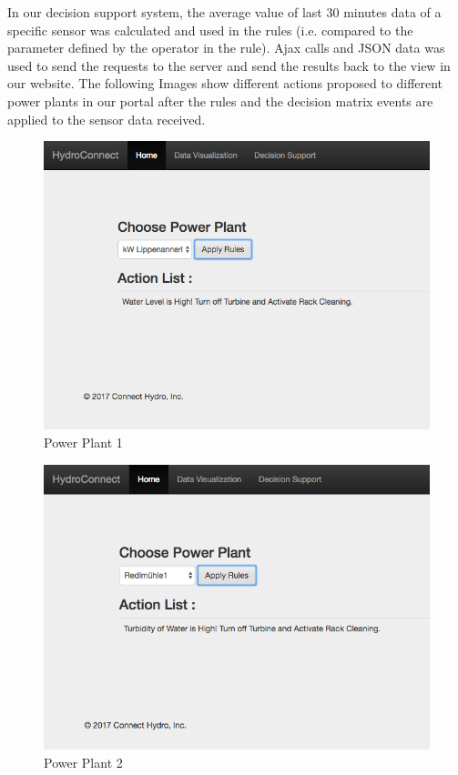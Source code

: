 In our decision support system, the average value of last 30 minutes data of a specific sensor was calculated and used in the rules (i.e. compared to the parameter defined by the operator in the rule). Ajax calls and JSON data was used to send the requests to the server and send the results back to the view in our website. The following Images show different actions proposed to different power plants in our portal after the rules and the decision matrix events are applied to the sensor data received.
\begin{figure}[H]
\centering
\includegraphics[scale=0.6]{Images/Screen1.png}
\caption[Power Plant 1]{Power Plant 1}
\end{figure}
\begin{figure}[H]
\centering
\includegraphics[scale=0.6]{Images/Screen2.png}
\caption[Power Plant 2]{Power Plant 2}
\end{figure}
